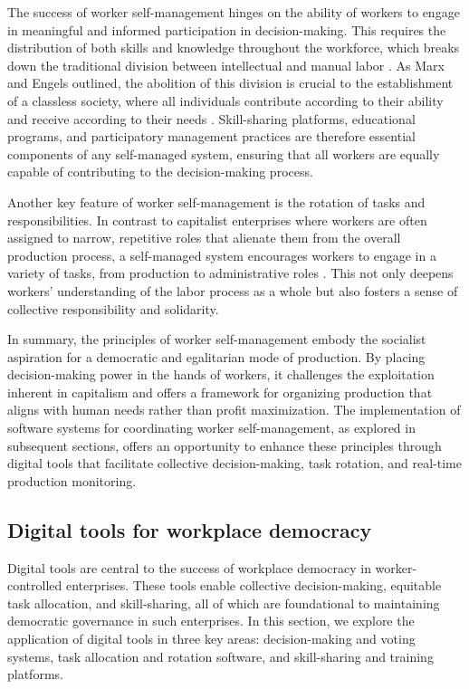 \begin{refsection}
The success of worker self-management hinges on the ability of workers to engage in meaningful and informed participation in decision-making. This requires the distribution of both skills and knowledge throughout the workforce, which breaks down the traditional division between intellectual and manual labor \cite[pp.~22-26]{wright2010}. As Marx and Engels outlined, the abolition of this division is crucial to the establishment of a classless society, where all individuals contribute according to their ability and receive according to their needs \cite[pp.~58-63]{marx1977}. Skill-sharing platforms, educational programs, and participatory management practices are therefore essential components of any self-managed system, ensuring that all workers are equally capable of contributing to the decision-making process.

Another key feature of worker self-management is the rotation of tasks and responsibilities. In contrast to capitalist enterprises where workers are often assigned to narrow, repetitive roles that alienate them from the overall production process, a self-managed system encourages workers to engage in a variety of tasks, from production to administrative roles \cite[pp.~201-205]{sitrin2012}. This not only deepens workers' understanding of the labor process as a whole but also fosters a sense of collective responsibility and solidarity.

In summary, the principles of worker self-management embody the socialist aspiration for a democratic and egalitarian mode of production. By placing decision-making power in the hands of workers, it challenges the exploitation inherent in capitalism and offers a framework for organizing production that aligns with human needs rather than profit maximization. The implementation of software systems for coordinating worker self-management, as explored in subsequent sections, offers an opportunity to enhance these principles through digital tools that facilitate collective decision-making, task rotation, and real-time production monitoring.

\subsection{Digital tools for workplace democracy}

Digital tools are central to the success of workplace democracy in worker-controlled enterprises. These tools enable collective decision-making, equitable task allocation, and skill-sharing, all of which are foundational to maintaining democratic governance in such enterprises. In this section, we explore the application of digital tools in three key areas: decision-making and voting systems, task allocation and rotation software, and skill-sharing and training platforms.


\end{refsection}
